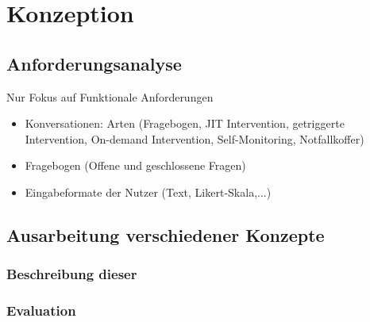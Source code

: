 \chapter{Konzeption}
\label{ch:Design}

\section{Anforderungsanalyse}

Nur Fokus auf Funktionale Anforderungen
\begin{itemize}
\item Konversationen: Arten (Fragebogen, JIT Intervention, getriggerte Intervention, On-demand Intervention, Self-Monitoring, Notfallkoffer)
\item Fragebogen (Offene und geschlossene Fragen)
\item Eingabeformate der Nutzer (Text, Likert-Skala,...)
\end{itemize}

\section{Ausarbeitung verschiedener Konzepte}
	\subsection{Beschreibung dieser}
	\subsection{Evaluation}
	



